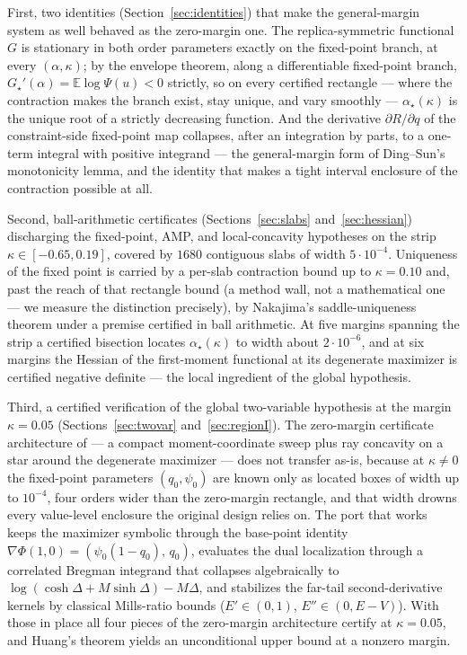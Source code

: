 \documentclass[11pt]{article}
\theoremstyle{remark}
\newcommand{\E}{\mathbb{E}}
\begin{document}
First, two identities (Section~\ref{sec:identities}) that make the
general-margin system as well behaved as the zero-margin one.  The
replica-symmetric functional $G$ is stationary in both order
parameters exactly on the fixed-point branch, at every $(\alpha,
\kappa)$; by the envelope theorem, along a differentiable fixed-point
branch, $G_\star'(\alpha)=\E\log\Psi(u)<0$ strictly, so on every
certified rectangle --- where the contraction makes the branch exist,
stay unique, and vary smoothly --- $\alpha_\star(\kappa)$ is the
unique root of a strictly decreasing function.  And the derivative $\partial R/\partial
q$ of the constraint-side fixed-point map collapses, after an
integration by parts, to a one-term integral with positive integrand
--- the general-margin form of Ding--Sun's monotonicity lemma, and the
identity that makes a tight interval enclosure of the contraction
possible at all.

Second, ball-arithmetic certificates (Sections~\ref{sec:slabs}
and~\ref{sec:hessian}) discharging the fixed-point, AMP, and
local-concavity hypotheses on the strip $\kappa\in[-0.65,0.19]$,
covered by $1680$ contiguous slabs of width $5\cdot10^{-4}$.
Uniqueness of the fixed point is carried by a per-slab contraction
bound up to $\kappa=0.10$ and, past the reach of that rectangle bound
(a method wall, not a mathematical one --- we measure the distinction
precisely), by Nakajima's saddle-uniqueness theorem
\cite{nakajima2025} under a premise certified in ball arithmetic.  At
five margins spanning the strip a certified bisection locates
$\alpha_\star(\kappa)$ to width about $2\cdot10^{-6}$, and at six
margins the Hessian of the first-moment functional at its degenerate
maximizer is certified negative definite --- the local ingredient of
the global hypothesis.

Third, a certified verification of the global two-variable hypothesis
at the margin $\kappa=0.05$ (Sections~\ref{sec:twovar}
and~\ref{sec:regionI}).  The zero-margin certificate architecture of
\cite{shmalo2026capacity} --- a compact moment-coordinate sweep plus
ray concavity on a star around the degenerate maximizer --- does not
transfer as-is, because at $\kappa\ne0$ the fixed-point parameters
$(q_0,\psi_0)$ are known only as located boxes of width up to
$10^{-4}$, four orders wider than the zero-margin rectangle, and that
width drowns every value-level enclosure the original design relies
on.  The port that works keeps the maximizer symbolic through the
base-point identity $\nabla\Phi(1,0)=(\psi_0(1-q_0),\,q_0)$, evaluates
the dual localization through a correlated Bregman integrand that
collapses algebraically to
$\log(\cosh\Delta+M\sinh\Delta)-M\Delta$, and stabilizes the far-tail
second-derivative kernels by classical Mills-ratio bounds
($E'\in(0,1)$, $E''\in(0,E-V)$).  With those in place all four pieces
of the zero-margin architecture certify at $\kappa=0.05$, and Huang's
theorem yields an unconditional upper bound at a nonzero margin.
\end{document}
